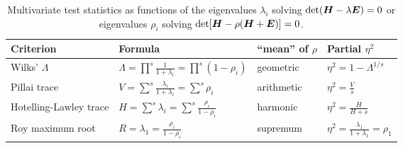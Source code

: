 %
%

\begin{table}[htb]
\renewcommand{\arraystretch}{1.6}
\caption{Multivariate test statistics as functions of the eigenvalues $\lambda_i$ solving $\mathrm{det} (\bm{H} - \lambda \bm{E})=0$
or eigenvalues $\rho_i$ solving  $\mathrm{det} [\bm{H} - \rho (\bm{H}+\bm{E})]=0$.
}\label{tab:criteria}
\begin{center}
\begin{tabular}{|l|l|l|l|}
  \hline
  Criterion & Formula & ``mean'' of $\rho$ & Partial $\eta^2$   \\
  \hline
  Wilks' $\Lambda$ & $\Lambda = \prod^s \frac{1}{1+\lambda_i} = \prod^s (1-\rho_i)$ & geometric & $\eta^2 = 1-\Lambda^{1/s}$   \\
  Pillai trace & $V = \sum^s \frac{\lambda_i}{1+\lambda_i} = \sum^s \rho_i$ & arithmetic & $\eta^2 = \frac{V}{s} $   \\
  Hotelling-Lawley trace & $H = \sum^s \lambda_i = \sum^s \frac{\rho_i}{1-\rho_i} $ & harmonic & $\eta^2 = \frac{H}{H+s}$   \\
  Roy maximum root & $R = \lambda_1 = \frac{\rho_i}{1-\rho_i}$  & supremum & $ \eta^2 = \frac{\lambda_1}{1+\lambda_1} = \rho_1$   \\
  \hline
\end{tabular}
\end{center}
\end{table}
%
